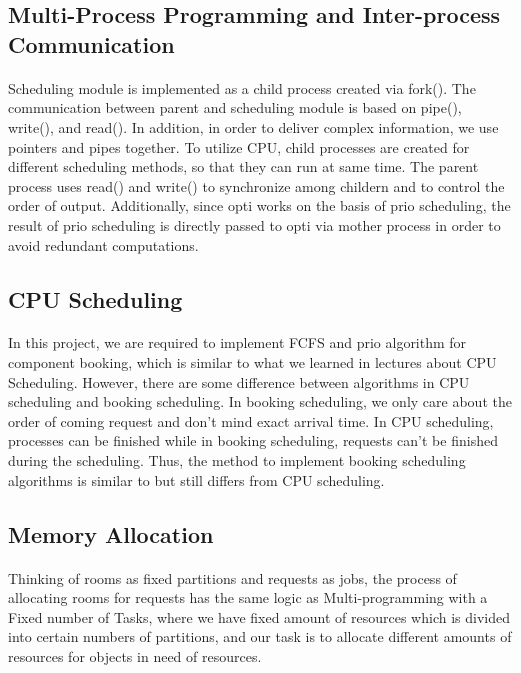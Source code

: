 \documentclass{article}
\begin{document}
        \subsection{Multi-Process Programming and Inter-process Communication}
            \paragraph{}
            Scheduling module is implemented as a child process created via fork(). The communication between parent and scheduling module is based on pipe(), write(), and read(). In addition, in order to deliver complex information, we use pointers and pipes together. To utilize CPU, child processes are created for different scheduling methods, so that they can run at same time. The parent process uses read() and write() to synchronize among childern and to control the order of output. Additionally, since opti works on the basis of prio scheduling, the result of prio scheduling is directly passed to opti via mother process in order to avoid redundant computations.
        \subsection{ CPU Scheduling}
            \paragraph{}
            In this project, we are required to implement FCFS and prio algorithm for component booking, which is similar to what we learned in lectures about CPU Scheduling. However, there are some difference between algorithms in CPU scheduling and booking scheduling. In booking scheduling, we only care about the order of coming request and don't mind exact arrival time. In CPU scheduling, processes can be finished while in booking scheduling, requests can't be finished during the scheduling. Thus, the method to implement booking scheduling algorithms is similar to but still differs from CPU scheduling.
        \subsection{Memory Allocation}
            \paragraph{}
            Thinking of rooms as fixed partitions and requests as jobs, the process of allocating rooms for requests has the same logic as Multi-programming with a Fixed number of Tasks, where we have fixed amount of resources which is divided into certain numbers of partitions, and our task is to allocate different amounts of resources for objects in need of resources.
\end{document}
